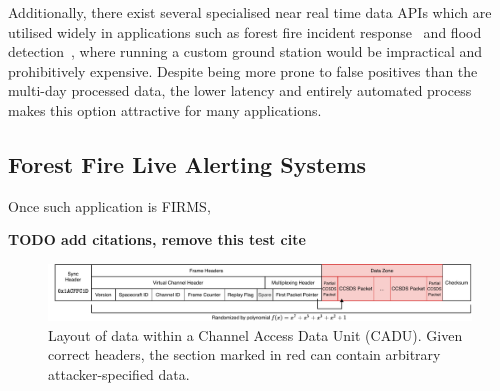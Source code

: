 Additionally, there exist several specialised near real time data APIs which are utilised widely in applications such as forest fire incident response~\cite{nasaFirms} and flood detection~\cite{nasaFlood}, where running a custom ground station would be impractical and prohibitively expensive.
Despite being more prone to false positives than the multi-day processed data, the lower latency and entirely automated process makes this option attractive for many applications.

\subsection{Forest Fire Live Alerting Systems} %

Once such application is FIRMS,


\textbf{TODO add citations, remove this test cite}~\cite{moser2019digital}

\begin{figure}
    \centering
    \includegraphics[width=\textwidth]{diagrams/cadu_diagram.pdf}
    \caption{Layout of data within a Channel Access Data Unit (CADU). Given correct headers, the section marked in red can contain arbitrary attacker-specified data.}
    \label{fig:cadu_diagram}
\end{figure}






